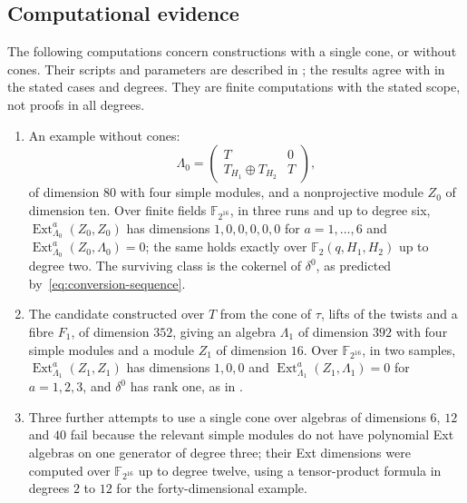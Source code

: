 \subsection{Computational evidence}
\label{subsec:obstruction-computations}

The following computations concern constructions with a single cone, or without
cones. Their scripts and parameters are described in ;
the results agree with  in the stated cases and degrees.
They are finite computations with the stated scope,
not proofs in all degrees.
\begin{enumerate}
  \item An example without cones:
    \[
      \Lambda_0=\begin{pmatrix}T&0\\T_{H_1}\oplus T_{H_2}&T\end{pmatrix},
    \]
    of dimension $80$ with four simple modules, and a nonprojective module $Z_0$
    of dimension ten. Over finite fields $\mathbb{F}_{2^{16}}$, in three runs
    and up to degree six, $\operatorname{Ext}^a_{\Lambda_0}(Z_0,Z_0)$ has
    dimensions $1,0,0,0,0,0$ for ${a=1,\dots,6}$ and
    ${\operatorname{Ext}^a_{\Lambda_0}(Z_0,\Lambda_0)=0}$; the same holds exactly
    over $\mathbb{F}_2(q,H_1,H_2)$ up to degree two. The surviving class is the
    cokernel of $\delta^0$, as predicted by~\eqref{eq:conversion-sequence}.
  \item The candidate constructed over $T$ from the cone of $\tau$, lifts of
    the twists and a fibre $F_1$, of dimension $352$, giving an algebra
    $\Lambda_1$ of dimension $392$ with four simple modules and a module $Z_1$
    of dimension $16$. Over $\mathbb{F}_{2^{16}}$, in two samples,
    $\operatorname{Ext}^a_{\Lambda_1}(Z_1,Z_1)$ has dimensions $1,0,0$ and
    ${\operatorname{Ext}^a_{\Lambda_1}(Z_1,\Lambda_1)=0}$ for ${a=1,2,3}$, and
    $\delta^0$ has rank one, as in .
  \item Three further attempts to use a single cone over algebras of dimensions
    $6$, $12$ and $40$ fail because the relevant simple modules do not have
    polynomial Ext algebras on one generator of degree three; their Ext
    dimensions were computed over $\mathbb{F}_{2^{16}}$ up to degree twelve,
    using a tensor-product formula in degrees $2$ to $12$ for the
    forty-dimensional example.
\end{enumerate}
